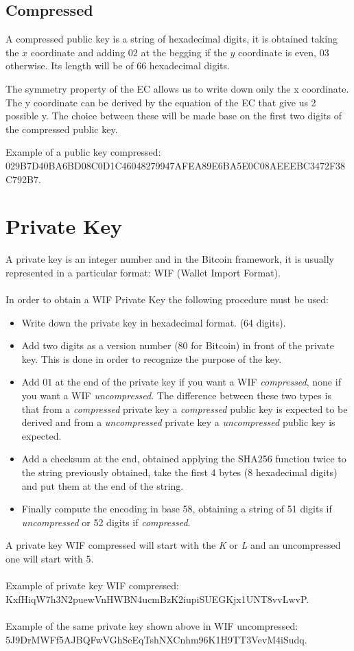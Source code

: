 \subsection{Compressed}
A compressed public key is a string of hexadecimal digits, it is obtained taking the $x$ coordinate and adding $02$ at the begging if the $y$ coordinate is even, $03$ otherwise. Its length will be of $66$ hexadecimal digits.

\begin{remark}
	The symmetry property of the EC allows us to write down only the x coordinate. The y coordinate can be derived by the equation of the EC that give us 2 possible y. The choice between these will be made base on the first two digits of the compressed public key.
\end{remark}
Example of a public key compressed:\\
029B7D40BA6BD08C0D1C46048279947AFEA89E6BA5E0C08AEEEBC3472F38C792B7.


\section{Private Key}
A private key is an integer number and in the Bitcoin framework, it is usually represented in a particular format: WIF (Wallet Import Format). 
\\ \\
In order to obtain a WIF Private Key the following procedure must be used:
\begin{itemize}
	\item Write down the private key in hexadecimal format. (64 digits).
	\item Add two digits as a version number ($80$ for Bitcoin) in front of the private key. This is done in order to recognize the purpose of the key.
	\item Add $01$ at the end of the private key if you want a WIF \textit{compressed}, none if you want a WIF \textit{uncompressed}. The difference between these two types is that from a \textit{compressed} private key a \textit{compressed} public key is expected to be derived and from a \textit{uncompressed} private key a \textit{uncompressed} public key is expected.
	\item Add a checksum at the end, obtained applying the SHA256 function twice to the string previously obtained, take the first 4 bytes (8 hexadecimal digits) and put them at the end of the string.
	\item Finally compute the encoding in base 58, obtaining a string of 51 digits if \textit{uncompressed} or 52 digits if \textit{compressed}.
\end{itemize}
A private key WIF compressed will start with the \textit{K} or \textit{L} and an uncompressed one will start with 5.
\\ \\
Example of private key WIF compressed: \\ KxfHiqW7h3N2puewVnHWBN4ucmBzK2iupiSUEGKjx1UNT8vvLwvP.
\\ \\
Example of the same private key shown above in WIF uncompressed: \\ 5J9DrMWFf5AJBQFwVGhSeEqTshNXCnhm96K1H9TT3VevM4iSudq.

